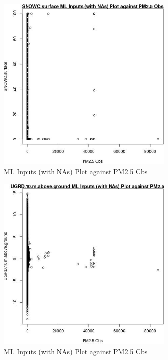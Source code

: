 \begin{figure} 
\centering  
\includegraphics[width=0.77\textwidth]{Code_Outputs/Report_ML_input_PM25_Step4_part_f_de_duplicated_aves_prioritize_24hr_obswNAs_SNOWCsurfacevPM25_Obs.jpg} 
\caption{\label{fig:Report_ML_input_PM25_Step4_part_f_de_duplicated_aves_prioritize_24hr_obswNAsSNOWCsurfacevPM25_Obs}ML Inputs (with NAs) Plot against PM2.5 Obs} 
\end{figure} 
 

\begin{figure} 
\centering  
\includegraphics[width=0.77\textwidth]{Code_Outputs/Report_ML_input_PM25_Step4_part_f_de_duplicated_aves_prioritize_24hr_obswNAs_UGRD10mabovegroundvPM25_Obs.jpg} 
\caption{\label{fig:Report_ML_input_PM25_Step4_part_f_de_duplicated_aves_prioritize_24hr_obswNAsUGRD10mabovegroundvPM25_Obs}ML Inputs (with NAs) Plot against PM2.5 Obs} 
\end{figure} 
 

